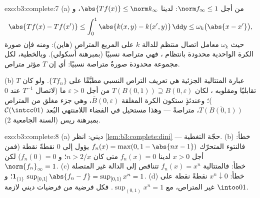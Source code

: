 \begin{solution}{exo:b3:complete:7}
(a) من أجل $\norm f_\infty \leq 1$: لدينا $\abs{Tf(x)} \leq
\norm k_\infty$، و
\[
\abs{Tf(x) - Tf(x')} \leq \int_0^1\abs{k(x,y) -
k(x',y)}\,\dd y \leq \omega_k\bigl(\abs{x - x'}\bigr),
\]
حيث $\omega_k$ معامل اتصال منتظم للدالة $k$ على المربع المتراص
(هاين): ومنه فإن صورة الكرة الواحدية محدودة بانتظام ، فهي متراصة نسبيًا (بمبرهنة أسكولي). وبالخطية، لكل
مجموعة محدودة صورةٌ متراصة نسبيًا: أي إن $T$ مؤثر متراص.

(b) عبارة المتتالية الجزئية هي تعريف التراص النسبي مطبَّقًا على
$\{Tf_n\}$. ولو كان $T$ تقابليًا ومقلوبه ، لكان $T(B(0,1)) \supseteq B(0,
\varepsilon)$ من
أجل $\varepsilon > 0$ ما (لاتصال $T^{-1}$ عند $0$)؛ وعندئذٍ ستكون الكرة
المغلقة $\bar B(0,\varepsilon)$، وهي جزء مغلق من المتراص $\overline{T(B(0,1))}$، متراصةً ---
وهذا مستحيل في الفضاء اللامنتهي البُعد $\mathcal
C(\intcc01)$ بمبرهنة ريس
(السنة الجامعية 2).
\end{solution}

\begin{solution}{exo:b3:complete:8}
(a) ديني: انظر \cref{lem:b3:complete:dini} --- حجّة التغطية. (b) خطأ: فالنتوء
المتحرّك $f_n(x) = \max(0, 1 -
\abs{nx - 1})$ يؤول إلى $0$ نقطةً نقطة (فمن أجل $x > 0$ لدينا
$f_n(x) =
0$ متى كان $n > 2/x$؛ و $f_n(0) = 0$) لكن $\norm{f_n}_\infty = 1$. (c) خطأ:
فالمتتالية $f_n(x) = x^n$ تتناقص إلى الدالة غير المتصلة $\mathbf 1_{\{1\}}$؛
و $\sup_{[0,1]}\abs{f_n - f} = \sup_{[0,1)}
x^n = 1$. (d) خطأ: $x^n \downarrow 0$ نقطةً نقطة على $\intoo01$ غير
المتراص، مع $\sup_{(0,1)}x^n = 1$. فكل فرضية من فرضيات ديني لازمة.
\end{solution}

